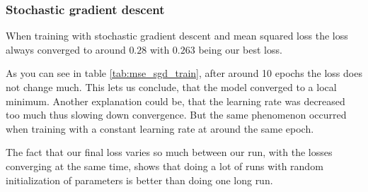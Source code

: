 \subsubsection{Stochastic gradient descent}
When training with stochastic gradient descent and mean 
squared loss the loss always converged to around $0.28$ 
with $0.263$ being our best loss.

As you can see in table \ref*{tab:mse_sgd_train}, after around 10 epochs 
the loss does not change much.
This lets us conclude, that the model converged to a local minimum. Another explanation
could be, that the learning rate was decreased too much thus slowing down convergence. 
But the same phenomenon occurred when training with a constant learning rate at around 
the same epoch.

The fact that our final loss varies so much between our run, with the losses 
converging at the same time, shows that doing a lot of runs with random 
initialization of parameters is better than doing one long run.


